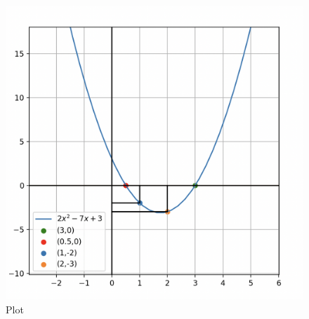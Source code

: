 \documentclass[12pt]{article}
\begin{document}
\begin{figure}[H]
    \centering
    \includegraphics[width=0.9\columnwidth]{Figs/9416.png}
    \caption{Plot}
    \label{fig:placeholder}
\end{figure}
\end{document}
